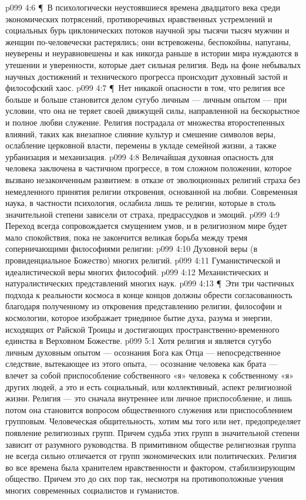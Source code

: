\vs p099 4:6 \P\ В психологически неустоявшиеся времена двадцатого века среди экономических потрясений, противоречивых нравственных устремлений и социальных бурь циклонических потоков научной эры тысячи тысяч мужчин и женщин по\hyp{}человечески растерялись; они встревожены, беспокойны, напуганы, неуверены и неуравновешены и как никогда раньше в истории мира нуждаются в утешении и уверенности, которые дает сильная религия. Ведь на фоне небывалых научных достижений и технического прогресса происходит духовный застой и философский хаос.
\vs p099 4:7 \P\ Нет никакой опасности в том, что религия все больше и больше становится делом сугубо личным --- личным опытом --- при условии, что она не теряет своей движущей силы, направленной на бескорыстное и полное любви служение. Религия пострадала от множества второстепенных влияний, таких как внезапное слияние культур и смешение символов веры, ослабление церковной власти, перемены в укладе семейной жизни, а также урбанизация и механизация.
\vs p099 4:8 Величайшая духовная опасность для человека заключена в частичном прогрессе, в том сложном положении, которое вызвано незаконченным развитием: в отказе от эволюционных религий страха без немедленного принятия религии откровения, основанной на любви. Современная наука, в частности психология, ослабила лишь те религии, которые в столь значительной степени зависели от страха, предрассудков и эмоций.
\vs p099 4:9 Переход всегда сопровождается смущением умов, и в религиозном мире будет мало спокойствия, пока не закончится великая борьба между тремя соперничающими философиями религии:
\vs p099 4:10 \bibnobreakspace Духовной веры (в провиденциальное Божество) многих религий.
\vs p099 4:11 \bibnobreakspace Гуманистической и идеалистической веры многих философий.
\vs p099 4:12 \bibnobreakspace Механистических и натуралистических представлений многих наук.
\vs p099 4:13 \P\ Эти три частичных подхода к реальности космоса в конце концов должны обрести согласованность благодаря полученному из откровения представлению религии, философии и космологии, которое изображает триединое бытие духа, разума и энергии, исходящих от Райской Троицы и достигающих пространственно\hyp{}временного единства в Верховном Божестве.
\vs p099 5:1 Хотя религия и является сугубо личным духовным опытом --- осознания Бога как Отца --- непосредственное следствие, вытекающее из этого опыта, --- осознание человека как брата --- влечет за собой приспособление собственного «я» человека к собственному «я» других людей, а это и есть социальный, или коллективный, аспект религиозной жизни. Религия --- это сначала внутреннее или личное приспособление, и лишь потом она становится вопросом общественного служения или приспособлением групповым. Человеческая общительность, хотим мы того или нет, предопределяет появление религиозных групп. Причем судьба этих групп в значительной степени зависит от разумного руководства. В примитивном обществе религиозная группа не всегда сильно отличается от групп экономических или политических. Религия во все времена была хранителем нравственности и фактором, стабилизирующим общество. Причем это до сих пор так, несмотря на противоположные учения многих современных социалистов и гуманистов.
